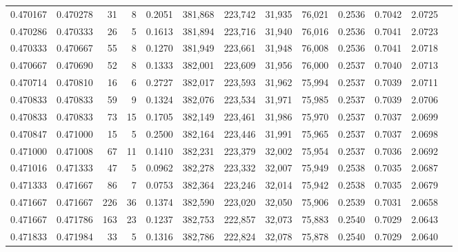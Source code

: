 \begin{tabular}{rrrrrrrrrrrrr}
0.470167 & 0.470278 &    31 &   8 &                                     0.2051 & 381,868 & 223,742 &  31,935 &  76,021 & 0.2536 & 0.7042 & 2.0725 \\
0.470286 & 0.470333 &    26 &   5 &                                     0.1613 & 381,894 & 223,716 &  31,940 &  76,016 & 0.2536 & 0.7041 & 2.0723 \\
0.470333 & 0.470667 &    55 &   8 &                                     0.1270 & 381,949 & 223,661 &  31,948 &  76,008 & 0.2536 & 0.7041 & 2.0718 \\
0.470667 & 0.470690 &    52 &   8 &                                     0.1333 & 382,001 & 223,609 &  31,956 &  76,000 & 0.2537 & 0.7040 & 2.0713 \\
0.470714 & 0.470810 &    16 &   6 &                                     0.2727 & 382,017 & 223,593 &  31,962 &  75,994 & 0.2537 & 0.7039 & 2.0711 \\
0.470833 & 0.470833 &    59 &   9 &                                     0.1324 & 382,076 & 223,534 &  31,971 &  75,985 & 0.2537 & 0.7039 & 2.0706 \\
0.470833 & 0.470833 &    73 &  15 &                                     0.1705 & 382,149 & 223,461 &  31,986 &  75,970 & 0.2537 & 0.7037 & 2.0699 \\
0.470847 & 0.471000 &    15 &   5 &                                     0.2500 & 382,164 & 223,446 &  31,991 &  75,965 & 0.2537 & 0.7037 & 2.0698 \\
0.471000 & 0.471008 &    67 &  11 &                                     0.1410 & 382,231 & 223,379 &  32,002 &  75,954 & 0.2537 & 0.7036 & 2.0692 \\
0.471016 & 0.471333 &    47 &   5 &                                     0.0962 & 382,278 & 223,332 &  32,007 &  75,949 & 0.2538 & 0.7035 & 2.0687 \\
0.471333 & 0.471667 &    86 &   7 &                                     0.0753 & 382,364 & 223,246 &  32,014 &  75,942 & 0.2538 & 0.7035 & 2.0679 \\
0.471667 & 0.471667 &   226 &  36 &                                     0.1374 & 382,590 & 223,020 &  32,050 &  75,906 & 0.2539 & 0.7031 & 2.0658 \\
0.471667 & 0.471786 &   163 &  23 &                                     0.1237 & 382,753 & 222,857 &  32,073 &  75,883 & 0.2540 & 0.7029 & 2.0643 \\
0.471833 & 0.471984 &    33 &   5 &                                     0.1316 & 382,786 & 222,824 &  32,078 &  75,878 & 0.2540 & 0.7029 & 2.0640 \\

\end{tabular}
